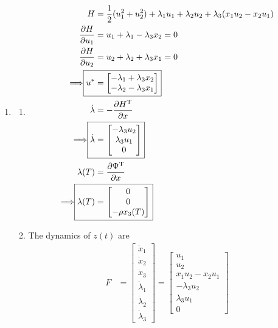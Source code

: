 \documentclass[letterpaper,11pt,titlepage]{article}
\newcommand{\trans}{^\text{T}}
\newcommand*\pder[2]{\frac{\partial #1}{\partial #2}}
\begin{document}
\begin{enumerate}[leftmargin=0pt]
\item \begin{enumerate}
  \item 
    \begin{align}
      H &= \frac12 (u_1^2 + u_2^2) + \lambda_1 u_1 + \lambda_2 u_2 + \lambda_3 (x_1u_2 - x_2u_1) \\
      \pder{H}{u_1} &= u_1 + \lambda_1 - \lambda_3 x_2 = 0 \\
      \pder{H}{u_2} &= u_2 + \lambda_2 + \lambda_3 x_1 = 0 \\
      \Longrightarrow \Aboxed{u^* &= \begin{bmatrix}
          -\lambda_1 + \lambda_3 x_2 \\
          -\lambda_2 - \lambda_3 x_1
        \end{bmatrix}} \\
      \dot\lambda &= -\pder{H\trans}{x} \\
      \Longrightarrow \Aboxed{\dot\lambda &= \begin{bmatrix}
          -\lambda_3 u_2 \\ \lambda_3 u_1 \\ 0
        \end{bmatrix}} \\
      \lambda(T) &= \pder{\Psi\trans}{x} \\
      \Longrightarrow \Aboxed{\lambda(T) &= \begin{bmatrix}
          0 \\ 0 \\ -\rho x_3(T)
        \end{bmatrix}}
    \end{align}
  \item The dynamics of $z(t)$ are
    \begin{align}
      F &= \begin{bmatrix}
        \dot x_1 \\ \dot x_2 \\ \dot x_3 \\ \dot\lambda_1 \\ \dot\lambda_2 \\ \dot\lambda_3
      \end{bmatrix}
      = \begin{bmatrix}
        u_1 \\ u_2 \\ x_1u_2 - x_2u_1 \\
        -\lambda_3 u_2 \\ \lambda_3 u_1 \\ 0

\end{bmatrix}
\end{align}
\end{enumerate}
\end{enumerate}
\end{document}
